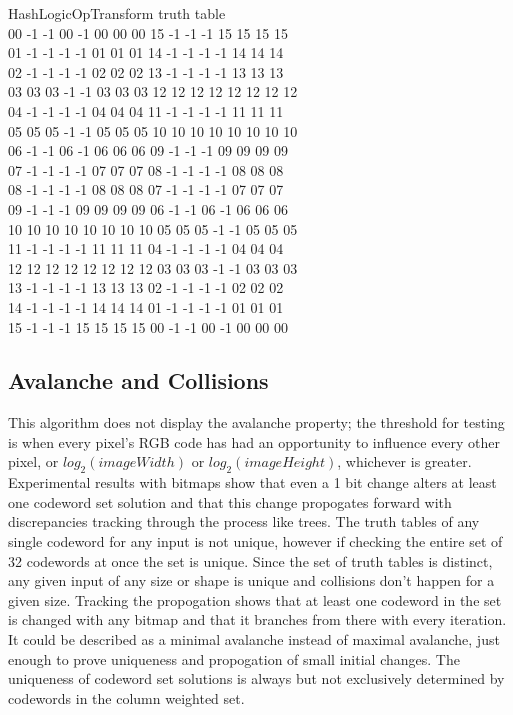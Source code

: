 \documentclass[11pt]{article}
\begin{document}
HashLogicOpTransform truth table\\
00 -1 -1 00 -1 00 00 00 15 -1 -1 -1 15 15 15 15 \\
01 -1 -1 -1 -1 01 01 01 14 -1 -1 -1 -1 14 14 14 \\
02 -1 -1 -1 -1 02 02 02 13 -1 -1 -1 -1 13 13 13 \\
03 03 03 -1 -1 03 03 03 12 12 12 12 12 12 12 12 \\
04 -1 -1 -1 -1 04 04 04 11 -1 -1 -1 -1 11 11 11 \\
05 05 05 -1 -1 05 05 05 10 10 10 10 10 10 10 10 \\
06 -1 -1 06 -1 06 06 06 09 -1 -1 -1 09 09 09 09 \\
07 -1 -1 -1 -1 07 07 07 08 -1 -1 -1 -1 08 08 08 \\
08 -1 -1 -1 -1 08 08 08 07 -1 -1 -1 -1 07 07 07 \\
09 -1 -1 -1 09 09 09 09 06 -1 -1 06 -1 06 06 06 \\
10 10 10 10 10 10 10 10 05 05 05 -1 -1 05 05 05 \\
11 -1 -1 -1 -1 11 11 11 04 -1 -1 -1 -1 04 04 04 \\
12 12 12 12 12 12 12 12 03 03 03 -1 -1 03 03 03 \\
13 -1 -1 -1 -1 13 13 13 02 -1 -1 -1 -1 02 02 02 \\
14 -1 -1 -1 -1 14 14 14 01 -1 -1 -1 -1 01 01 01 \\
15 -1 -1 -1 15 15 15 15 00 -1 -1 00 -1 00 00 00 \\

\subsection{Avalanche and Collisions}
This algorithm does not display the avalanche property; the threshold for testing is when every pixel's RGB code has had an opportunity to influence every other pixel, or $log_2(imageWidth)$ or $log_2(imageHeight)$, whichever is greater. Experimental results with bitmaps show that even a 1 bit change alters at least one codeword set solution and that this change propogates forward with discrepancies tracking through the process like trees. The truth tables of any single codeword for any input is not unique, however if checking the entire set of 32 codewords at once the set is unique. Since the set of truth tables is distinct, any given input of any size or shape is unique and collisions don't happen for a given size. Tracking the propogation shows that at least one codeword in the set is changed with any bitmap and that it branches from there with every iteration. It could be described as a minimal avalanche instead of maximal avalanche, just enough to prove uniqueness and propogation of small initial changes. The uniqueness of codeword set solutions is always but not exclusively determined by codewords in the column weighted set.\\
\end{document}
